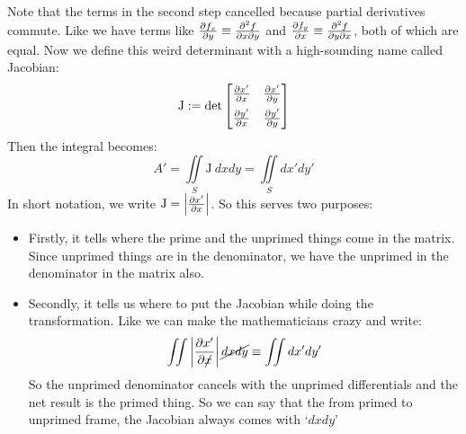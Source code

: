 Note that the terms in the second step cancelled because partial derivatives commute. Like we have terms like $\pdv{f_x}{y}\equiv \frac{\partial^2 f}{\partial x\partial y}$ and $\pdv{f_y}{x}\equiv \frac{\partial^2 f}{\partial y\partial x}$, both of which are equal. Now we define this weird determinant with a high-sounding name called Jacobian:
$$\mathrm{J} := \det \begin{bmatrix}
        \pdv{x'}{x} & \pdv{x'}{y} \\[0.2cm]
        \pdv{y'}{x} & \pdv{y'}{y}
    \end{bmatrix}$$
    Then the integral becomes:
    $$A' = \iint\limits_S  \mathrm{J}\ dxdy = \iint\limits_S dx'dy'$$
    In short notation, we write $\mathrm{J} = \left|\pdv{x'}{x}\right|$. So this serves two purposes: \begin{itemize}
        \item Firstly, it tells where the prime and the unprimed things come in the matrix. Since unprimed things are in the denominator, we have the unprimed in the denominator in the matrix also. 
        \item Secondly, it tells us where to put the Jacobian while doing the transformation. Like we can make the mathematicians crazy and write:
        $$\iint \left|\pdv{x'}{\cancel{x}}\right| \cancel{dxdy} \equiv \iint dx'dy'$$
        So the unprimed denominator cancels with the unprimed differentials and the net result is the primed thing. So we can say that the from primed to unprimed frame, the Jacobian always comes with `$dxdy$'
    \end{itemize}